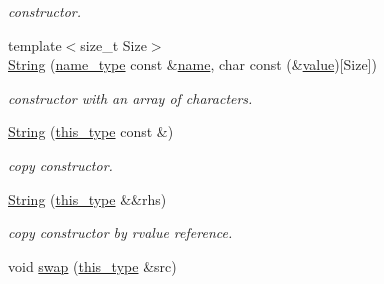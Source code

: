 \begin{DoxyCompactItemize}
\begin{DoxyCompactList}\small\item\em constructor. \end{DoxyCompactList}\item 
\hypertarget{classhryky_1_1reduction_1_1_string_ae51e2574fb2566ea5376429087259257}{{\footnotesize template$<$size\-\_\-t Size$>$ }\\\hyperlink{classhryky_1_1reduction_1_1_string_ae51e2574fb2566ea5376429087259257}{String} (\hyperlink{namespacehryky_1_1reduction_ac686c30a4c8d196bbd0f05629a6b921f}{name\-\_\-type} const \&\hyperlink{classhryky_1_1reduction_1_1_base_a842569265d741905eb8a353d3935f1d1}{name}, char const (\&\hyperlink{classhryky_1_1reduction_1_1_string_a34e0856d63ec32786de19999a4ac1ce1}{value})\mbox{[}Size\mbox{]})}\label{classhryky_1_1reduction_1_1_string_ae51e2574fb2566ea5376429087259257}

\begin{DoxyCompactList}\small\item\em constructor with an array of characters. \end{DoxyCompactList}\item 
\hypertarget{classhryky_1_1reduction_1_1_string_adb88a560c2da744457fb84ca1e84a39c}{\hyperlink{classhryky_1_1reduction_1_1_string_adb88a560c2da744457fb84ca1e84a39c}{String} (\hyperlink{classhryky_1_1reduction_1_1_base_af02a7dee6042080b7380afd2f9500a42}{this\-\_\-type} const \&)}\label{classhryky_1_1reduction_1_1_string_adb88a560c2da744457fb84ca1e84a39c}

\begin{DoxyCompactList}\small\item\em copy constructor. \end{DoxyCompactList}\item 
\hypertarget{classhryky_1_1reduction_1_1_string_aaef2b75b29a25c40f0773db08cd852a9}{\hyperlink{classhryky_1_1reduction_1_1_string_aaef2b75b29a25c40f0773db08cd852a9}{String} (\hyperlink{classhryky_1_1reduction_1_1_base_af02a7dee6042080b7380afd2f9500a42}{this\-\_\-type} \&\&rhs)}\label{classhryky_1_1reduction_1_1_string_aaef2b75b29a25c40f0773db08cd852a9}

\begin{DoxyCompactList}\small\item\em copy constructor by rvalue reference. \end{DoxyCompactList}\item 
\hypertarget{classhryky_1_1reduction_1_1_string_a73b155e2731534a02f0c1112b1e001d0}{void \hyperlink{classhryky_1_1reduction_1_1_string_a73b155e2731534a02f0c1112b1e001d0}{swap} (\hyperlink{classhryky_1_1reduction_1_1_base_af02a7dee6042080b7380afd2f9500a42}{this\-\_\-type} \&src)}\label{classhryky_1_1reduction_1_1_string_a73b155e2731534a02f0c1112b1e001d0}


\end{DoxyCompactItemize}
